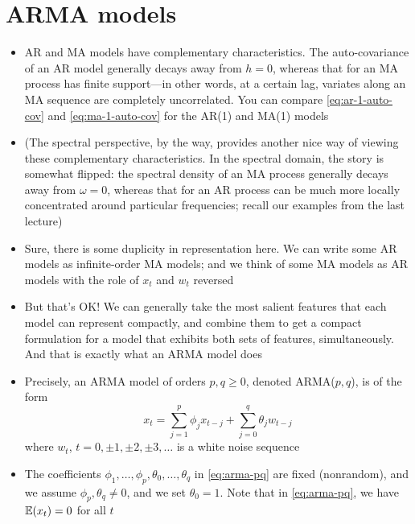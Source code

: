 \documentclass{article}
\begin{document}
\section{ARMA models}

\begin{itemize}
\item AR and MA models have complementary characteristics. The auto-covariance
  of an AR model generally decays away from $h=0$, whereas that for an MA
  process has finite support---in other words, at a certain lag, variates along
  an MA sequence are completely uncorrelated. You can compare
  \eqref{eq:ar-1-auto-cov} and \eqref{eq:ma-1-auto-cov} for the AR(1) and MA(1)
  models

\item (The spectral perspective, by the way, provides another nice way of
  viewing these complementary characteristics. In the spectral domain, the story
  is somewhat flipped: the spectral density of an MA process generally decays
  away from $\omega=0$, whereas that for an AR process can be much more locally
  concentrated around particular frequencies; recall our examples from the last
  lecture) 

\item Sure, there is some duplicity in representation here. We can write some AR
  models as infinite-order MA models; and we think of some MA models as AR
  models with the role of $x_t$ and $w_t$ reversed

\item But that's OK! We can generally take the most salient features that each
  model can represent compactly, and combine them to get a compact formulation
  for a model that exhibits both sets of features, simultaneously. And that is 
  exactly what an ARMA model does   

\item Precisely, an ARMA model of orders $p,q \geq 0$, denoted ARMA($p,q$), is
  of the form 
  \begin{equation}
    \label{eq:arma-pq}
  x_t = \sum_{j=1}^p \phi_j x_{t-j} + \sum_{j=0}^q \theta_j w_{t-j}  
  \end{equation}
  where $w_t$, $t = 0, \pm 1, \pm 2, \pm 3, \dots$ is a white noise sequence 

\item The coefficients $\phi_1,\dots,\phi_p,\theta_0,\dots,\theta_q$ in
  \eqref{eq:arma-pq} are fixed (nonrandom), and we assume $\phi_p,\theta_q \not=
  0$, and we set $\theta_0 = 1$. Note that in \eqref{eq:arma-pq}, we have
  $\mathbb{E}(x_t) = 0$ for all $t$ 


\end{itemize}
\end{document}
